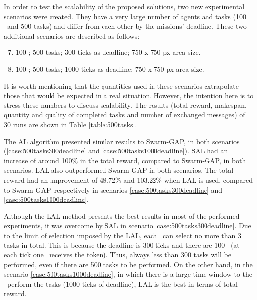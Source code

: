 In order to test the scalability of the proposed solutions, two new experimental scenarios were created. 
They have a very large number of agents and tasks (100 \uavs\ and 500 tasks) and differ from each other by the missions' deadline. These two additional scenarios are described as follows:

\begin{enumerate}
	\setcounter{enumi}{6}
	\item 100 \uavs; 500 tasks; 300 ticks as deadline; 750 x 750 px area size. \label{case:500tasks300deadline}
	\item 100 \uavs; 500 tasks; 1000 ticks as deadline; 750 x 750 px area size. \label{case:500tasks1000deadline}
\end{enumerate}

It is worth mentioning that the quantities used in these scenarios extrapolate those that would be expected in a real situation. However, the intention here is to stress these numbers to discuss scalability. 
The results (total reward, makespan, quantity and quality of completed tasks and number of exchanged messages) of 30 runs are shown in Table \ref{table:500tasks}.



The AL algorithm presented similar results to Swarm-GAP, in both scenarios (\ref{case:500tasks300deadline} and \ref{case:500tasks1000deadline}).
SAL had an increase of around 100\% in the total reward, compared to Swarm-GAP, in both scenarios.
LAL also outperformed Swarm-GAP in both scenarios. 
The total reward had an improvement of 48.72\% and 103.22\% when LAL is used, compared to Swarm-GAP, respectively in scenarios \ref{case:500tasks300deadline} and \ref{case:500tasks1000deadline}.

Although the LAL method presents the best results in most of the performed experiments, it was overcome by SAL in scenario \ref{case:500tasks300deadline}.
Due to the limit of selection imposed by the LAL, each \uav\ can select no more than 3 tasks in total. This is because the deadline is 300 ticks and there are 100 \uavs\ (at each tick one \uav\ receives the token). Thus, always less than 300 tasks will be performed, even if there are 500 tasks to be performed.
On the other hand, in the scenario \ref{case:500tasks1000deadline}, in which there is a large time window to the \uavs\ perform the tasks (1000 ticks of deadline), LAL is the best in terms of total reward.

